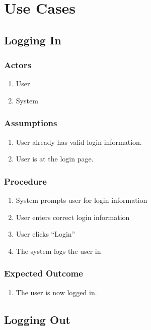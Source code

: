 \chapter{Use Cases}
{
    \renewcommand{\theenumi}{\thesubsection.\arabic{enumi}}
    \renewcommand{\theenumii}{\theenumi.\arabic{enumii}}
    \renewcommand{\theenumiii}{\theenumii.\arabic{enumiii}}

\section{Logging In}

\subsection{Actors}
	\begin{enumerate}
		\item User
		\item System
	\end{enumerate}
\subsection{Assumptions}
	\begin{enumerate}
		\item User already has valid login information.
		\item User is at the login page.
	\end{enumerate}
\subsection{Procedure}
	\begin{enumerate}
    	\item System prompts user for login information
    	\item User enters correct login information
    	\item User clicks ``Login''
    	\item The system logs the user in
    \end{enumerate}
\subsection{Expected Outcome}
    \begin{enumerate}
    	\item The user is now logged in.
    \end{enumerate}

\section{Logging Out}
}
